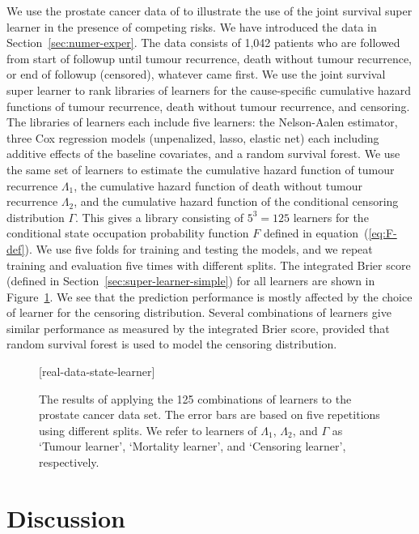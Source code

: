\documentclass[lineno]{biometrika}
\newcommand{\1}{\mathds{1}}
\begin{document}
We use the prostate cancer data of \cite{kattan2000pretreatment} to
illustrate the use of the joint survival super learner in the presence
of competing risks. We have introduced the data in
Section~\ref{sec:numer-exper}. The data consists of 1,042 patients who
are followed from start of followup until tumour recurrence, death
without tumour recurrence, or end of followup (censored), whatever
came first. We use the joint survival super learner to rank libraries
of learners for the cause-specific cumulative hazard functions of
tumour recurrence, death without tumour recurrence, and censoring. The
libraries of learners each include five learners: the Nelson-Aalen
estimator, three Cox regression models (unpenalized, lasso, elastic
net) each including additive effects of the baseline covariates, and a
random survival forest. We use the same set of learners to estimate
the cumulative hazard function of tumour recurrence \( \Lambda_1 \),
the cumulative hazard function of death without tumour recurrence
\( \Lambda_2 \), and the cumulative hazard function of the conditional
censoring distribution $\Gamma$. This gives a library consisting of
\( 5^3 = 125 \) learners for the conditional state occupation
probability function \( F \) defined in equation~(\ref{eq:F-def}). We
use five folds for training and testing the models, and we repeat
training and evaluation five times with different splits. The
integrated Brier score (defined in
Section~\ref{sec:super-learner-simple}) for all learners are shown in
Figure~\ref{fig:zelefski-real}. We see that the prediction performance
is mostly affected by the choice of learner for the censoring
distribution. Several combinations of learners give similar
performance as measured by the integrated Brier score, provided that
random survival forest is used to model the censoring distribution.

\begin{figure}
\figurebox{20pc}{25pc}{}[real-data-state-learner]
\caption{The results of applying the 125 combinations of learners to the
    prostate cancer data set. The error bars are based on five repetitions using
    different splits. We refer to learners of \( \Lambda_1 \), \( \Lambda_2 \),
    and $\Gamma$ as `Tumour learner', `Mortality learner', and `Censoring
    learner', respectively.}
\label{fig:zelefski-real}
\end{figure}


\section{Discussion}
\label{sec:discussion}
\end{document}
